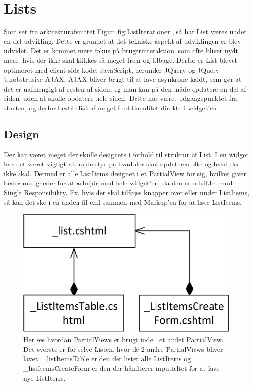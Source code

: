 \section{Lists}

Som set fra arkitekturafsnittet Figur \ref{fig:ListIterationer}, så har List væres under en del udvikling. Dette er grundet at det tekniske aspekt af udviklingen er blev udvidet. Det er kommet mere fokus på brugerinteraktion, som ofte bliver nydt mere, hvis der ikke skal klikkes så meget frem og tilbage. Derfor er List blevet optimeret med client-side kode; JavaScript, herunder JQuery og JQuery Unobstrusive AJAX. AJAX bliver brugt til at lave asynkrone kaldt, som gør at det er uafhængigt af resten af siden, og man kan på den måde opdatere en del af siden, uden at skulle opdatere hele siden. Dette har været udgangspunktet fra starten, og derfor består list af meget funktionalitet direkte i widget'en.

\subsection{Design}

Der har været meget der skulle designets i forhold til struktur af List. I en widget har det været vigtigt at holde styr på hvad der skal opdateres ofte og hvad der ikke skal. Dermed er alle ListItems designet i et PartialView for sig, hvilket giver bedre muligheder for at arbejde med hele widget'en, da den er udviklet mod Single Responsibility. Fx. hvis der skal tilføjes knapper over eller under ListItems, så kan det ske i en anden fil end sammen med Markup'en for at liste ListItems.

\begin{figure}[H]
    \centering
    \includegraphics{10_Design_og_implementering/Lists/Images/list_composition.png}
    \caption{Her ses hvordan PartialViews er brugt inde i et andet PartialView. Det øverste er for selve Listen, hvor de 2 andre PartialViews bliver lavet. \_listItemsTable er den der lister alle ListItems og \_listItemsCreateForm er den der håndterer inputfeltet for at lave nye ListItems.}
    \label{fig:list_composition}
\end{figure}

